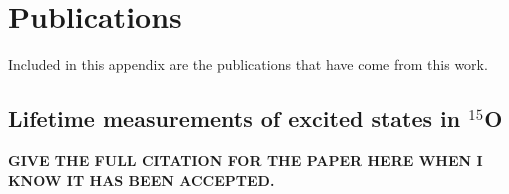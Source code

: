 %
%
%
%
%
%
%
%

%
%

\chapter{Publications}
\label{appendix: pubs}

Included in this appendix are the publications that have come from this work.



\section{Lifetime measurements of excited states in $^{15}$O}

\textbf{GIVE THE FULL CITATION FOR THE PAPER HERE WHEN I KNOW IT HAS BEEN ACCEPTED.}



%
% 
% 
